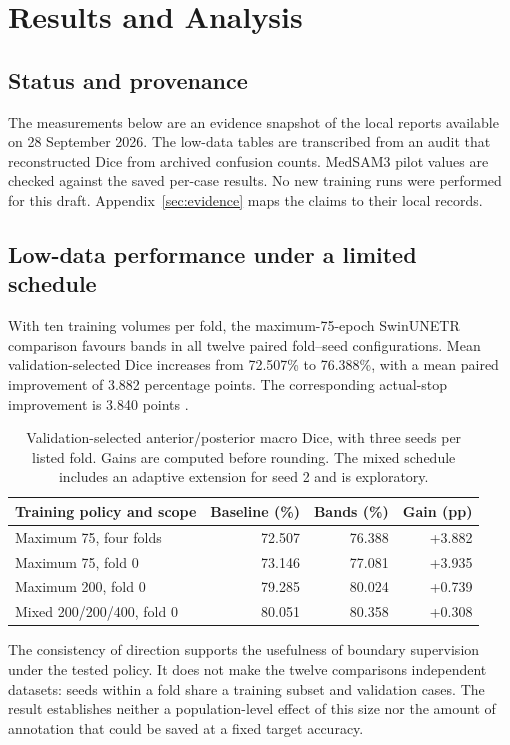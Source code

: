 \section{Results and Analysis}\label{sec:results}
\subsection{Status and provenance}
The measurements below are an evidence snapshot of the local reports available on 28 September 2026. The low-data tables are transcribed from an audit that reconstructed Dice from archived confusion counts. MedSAM3 pilot values are checked against the saved per-case results. No new training runs were performed for this draft. Appendix~\ref{sec:evidence} maps the claims to their local records.

\subsection{Low-data performance under a limited schedule}
With ten training volumes per fold, the maximum-75-epoch SwinUNETR comparison favours bands in all twelve paired fold--seed configurations. Mean validation-selected Dice increases from 72.507\% to 76.388\%, with a mean paired improvement of 3.882 percentage points. The corresponding actual-stop improvement is 3.840 points \cite{localLowDataAudit}.

\begin{table}[htbp]
\centering\small
\begin{tabularx}{\linewidth}{Xrrr}
\toprule
Training policy and scope & Baseline (\%) & Bands (\%) & Gain (pp)\\
\midrule
Maximum 75, four folds & 72.507 & 76.388 & +3.882\\
Maximum 75, fold 0 & 73.146 & 77.081 & +3.935\\
Maximum 200, fold 0 & 79.285 & 80.024 & +0.739\\
Mixed 200/200/400, fold 0 & 80.051 & 80.358 & +0.308\\
\bottomrule
\end{tabularx}
\caption{Validation-selected anterior/posterior macro Dice, with three seeds per listed fold. Gains are computed before rounding. The mixed schedule includes an adaptive extension for seed 2 and is exploratory.}\label{tab:swin}
\end{table}

The consistency of direction supports the usefulness of boundary supervision under the tested policy. It does not make the twelve comparisons independent datasets: seeds within a fold share a training subset and validation cases. The result establishes neither a population-level effect of this size nor the amount of annotation that could be saved at a fixed target accuracy.

